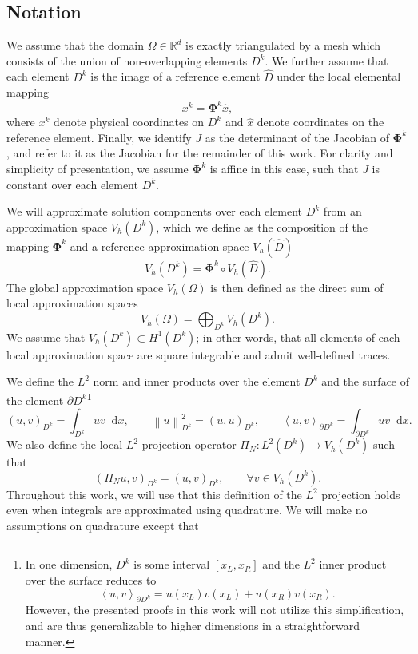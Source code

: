 \documentclass[preprint,10pt]{article}
\theoremstyle{definition}
\theoremstyle{lemma}
\theoremstyle{theorem}
\theoremstyle{assumption}
\newcommand{\nor}[1]{\left\| #1 \right\|}
\newcommand{\LRp}[1]{\left( #1 \right)}
\newcommand{\LRa}[1]{\left\langle #1 \right\rangle}
\newcommand{\note}[1]{{\color{blue}{#1}}}
\newcommand*\diff[1]{\mathop{}\!{\mathrm{d}#1}}
\begin{document}
\subsection{Notation}

We assume that the domain $\Omega \in \mathbb{R}^d$ is exactly triangulated by a mesh which consists of the union of non-overlapping elements $D^k$.  We further assume that each element $D^k$ is the image of a reference element $\widehat{D}$ under the local elemental mapping 
\[
x^k = \bm{\Phi}^k \widehat{x},
\]
where $x^k$ denote physical coordinates on $D^k$ and $\widehat{x}$ denote coordinates on the reference element.  Finally, we identify $J$ as the determinant of the Jacobian of $\bm{\Phi}^k$, and refer to it as the Jacobian for the remainder of this work.  For clarity and simplicity of presentation, we assume $\bm{\Phi}^k$ is affine in this case, such that $J$ is constant over each element $D^k$.  

We will approximate solution components over each element $D^k$ from an approximation space $V_h\LRp{D^k}$, which we define as the composition of the mapping $\bm{\Phi}^k$ and a reference approximation space $V_h\LRp{\widehat{D}}$
\[
V_h\LRp{D^k} = \bm{\Phi}^k \circ V_h\LRp{\widehat{D}}.
\]
The global approximation space $V_h\LRp{\Omega}$ is then defined as the direct sum of local approximation spaces
\[
V_h\LRp{\Omega} = \bigoplus_{D^k}V_h\LRp{D^k}.  
\]
We assume that $V_h(D^k) \subset H^1(D^k)$; in other words, that all elements of each local approximation space are square integrable and admit well-defined traces.  

We define the $L^2$ norm and inner products over the element $D^k$ and the surface of the element $\partial D^k$\footnote{In one dimension, $D^k$ is some interval $[x_L,x_R]$ and the $L^2$ inner product over the surface reduces to 
\[
\LRa{u,v}_{\partial D^k} = u(x_L)v(x_L) + u(x_R)v(x_R).
\]
However, the presented proofs in this work will not utilize this simplification, and are thus generalizable to higher dimensions in a straightforward manner.}
\[
\LRp{u,v}_{D^k} = \int_{D^k} u v\diff{x}, \qquad \nor{u}^2_{D^k} = (u,u)_{D^k}, \qquad \LRa{u,v}_{\partial D^k} = \int_{\partial D^k} u v \diff{x}.
\]
We also define the local $L^2$ projection operator $\Pi_N: L^2(D^k)\rightarrow V_h(D^k)$ such that
\[
\LRp{\Pi_N u,v}_{D^k} = \LRp{u,v}_{D^k}, \qquad \forall v\in V_h\LRp{D^k}.  
\]
Throughout this work, we will use that this definition of the $L^2$ projection holds even when integrals are approximated using quadrature.  We will make no assumptions on quadrature except that \note{specify assumptions - integrate polynomials of degree $N$ on the reference element exactly, such that integration by parts holds.  Add footnote that we can also generalize to the under-integrated case.  }
\end{document}
